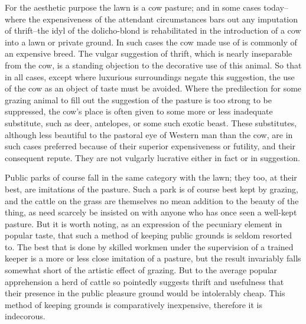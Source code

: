 \documentclass[12pt]{report}
\begin{document}
For the aesthetic purpose the lawn is a cow pasture; and in some cases
today--where the expensiveness of the attendant circumstances bars out
any imputation of thrift--the idyl of the dolicho-blond is rehabilitated
in the introduction of a cow into a lawn or private ground. In such
cases the cow made use of is commonly of an expensive breed. The vulgar
suggestion of thrift, which is nearly inseparable from the cow, is a
standing objection to the decorative use of this animal. So that in all
cases, except where luxurious surroundings negate this suggestion,
the use of the cow as an object of taste must be avoided. Where the
predilection for some grazing animal to fill out the suggestion of the
pasture is too strong to be suppressed, the cow's place is often given
to some more or less inadequate substitute, such as deer, antelopes, or
some such exotic beast. These substitutes, although less beautiful
to the pastoral eye of Western man than the cow, are in such cases
preferred because of their superior expensiveness or futility, and their
consequent repute. They are not vulgarly lucrative either in fact or in
suggestion.

Public parks of course fall in the same category with the lawn; they
too, at their best, are imitations of the pasture. Such a park is of
course best kept by grazing, and the cattle on the grass are themselves
no mean addition to the beauty of the thing, as need scarcely be
insisted on with anyone who has once seen a well-kept pasture. But it
is worth noting, as an expression of the pecuniary element in popular
taste, that such a method of keeping public grounds is seldom resorted
to. The best that is done by skilled workmen under the supervision of a
trained keeper is a more or less close imitation of a pasture, but
the result invariably falls somewhat short of the artistic effect of
grazing. But to the average popular apprehension a herd of cattle so
pointedly suggests thrift and usefulness that their presence in the
public pleasure ground would be intolerably cheap. This method
of keeping grounds is comparatively inexpensive, therefore it is
indecorous.
\end{document}
